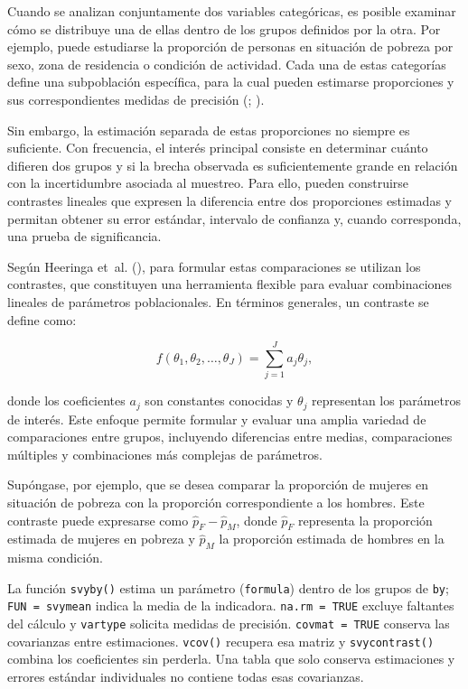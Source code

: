 \documentclass[
  spanish,
  11pt,
  letterpaper,
  oneside,
  open=any]{scrbook}
\begin{document}
Cuando se analizan conjuntamente dos variables categóricas, es posible
examinar cómo se distribuye una de ellas dentro de los grupos definidos
por la otra. Por ejemplo, puede estudiarse la proporción de personas en
situación de pobreza por sexo, zona de residencia o condición de
actividad. Cada una de estas categorías define una subpoblación
específica, para la cual pueden estimarse proporciones y sus
correspondientes medidas de precisión
(;
).

Sin embargo, la estimación separada de estas proporciones no siempre es
suficiente. Con frecuencia, el interés principal consiste en determinar
cuánto difieren dos grupos y si la brecha observada es suficientemente
grande en relación con la incertidumbre asociada al muestreo. Para ello,
pueden construirse contrastes lineales que expresen la diferencia entre
dos proporciones estimadas y permitan obtener su error estándar,
intervalo de confianza y, cuando corresponda, una prueba de
significancia.

Según Heeringa et~al. (),
para formular estas comparaciones se utilizan los contrastes, que
constituyen una herramienta flexible para evaluar combinaciones lineales
de parámetros poblacionales. En términos generales, un contraste se
define como:

\[
f\left(\theta_1,\theta_2,\ldots,\theta_J\right)
=
\sum_{j=1}^{J} a_j \theta_j,
\]

donde los coeficientes \(a_j\) son constantes conocidas y \(\theta_j\)
representan los parámetros de interés. Este enfoque permite formular y
evaluar una amplia variedad de comparaciones entre grupos, incluyendo
diferencias entre medias, comparaciones múltiples y combinaciones más
complejas de parámetros.

Supóngase, por ejemplo, que se desea comparar la proporción de mujeres
en situación de pobreza con la proporción correspondiente a los hombres.
Este contraste puede expresarse como \(\hat{p}_F-\hat{p}_M\), donde
\(\hat{p}_F\) representa la proporción estimada de mujeres en pobreza y
\(\hat{p}_M\) la proporción estimada de hombres en la misma condición.

La función \texttt{svyby()} estima un parámetro (\texttt{formula})
dentro de los grupos de \texttt{by}; \texttt{FUN\ =\ svymean} indica la
media de la indicadora. \texttt{na.rm\ =\ TRUE} excluye faltantes del
cálculo y \texttt{vartype} solicita medidas de precisión.
\texttt{covmat\ =\ TRUE} conserva las covarianzas entre estimaciones.
\texttt{vcov()} recupera esa matriz y \texttt{svycontrast()} combina los
coeficientes sin perderla. Una tabla que solo conserva estimaciones y
errores estándar individuales no contiene todas esas covarianzas.
\end{document}
